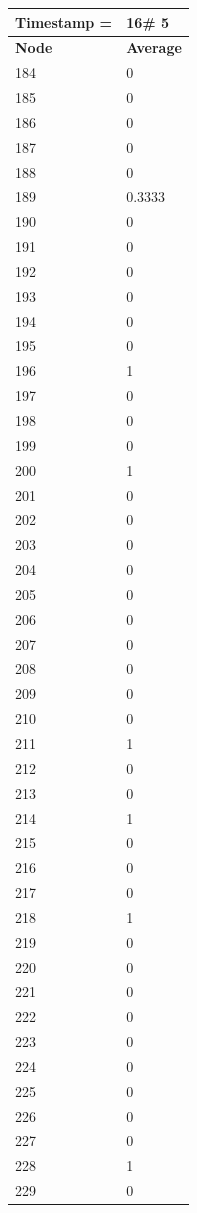 \begin{tabular}{|l||l|}
\hline
\textbf{Timestamp =} & \textbf{16}\# 5\\\hline
	\textbf{Node} & \textbf{Average} \\ \hline
\hline
	184 & 0 \\ \hline
	185 & 0 \\ \hline
	186 & 0 \\ \hline
	187 & 0 \\ \hline
	188 & 0 \\ \hline
	189 & 0.3333 \\ \hline
	190 & 0 \\ \hline
	191 & 0 \\ \hline
	192 & 0 \\ \hline
	193 & 0 \\ \hline
	194 & 0 \\ \hline
	195 & 0 \\ \hline
	196 & 1 \\ \hline
	197 & 0 \\ \hline
	198 & 0 \\ \hline
	199 & 0 \\ \hline
	200 & 1 \\ \hline
	201 & 0 \\ \hline
	202 & 0 \\ \hline
	203 & 0 \\ \hline
	204 & 0 \\ \hline
	205 & 0 \\ \hline
	206 & 0 \\ \hline
	207 & 0 \\ \hline
	208 & 0 \\ \hline
	209 & 0 \\ \hline
	210 & 0 \\ \hline
	211 & 1 \\ \hline
	212 & 0 \\ \hline
	213 & 0 \\ \hline
	214 & 1 \\ \hline
	215 & 0 \\ \hline
	216 & 0 \\ \hline
	217 & 0 \\ \hline
	218 & 1 \\ \hline
	219 & 0 \\ \hline
	220 & 0 \\ \hline
	221 & 0 \\ \hline
	222 & 0 \\ \hline
	223 & 0 \\ \hline
	224 & 0 \\ \hline
	225 & 0 \\ \hline
	226 & 0 \\ \hline
	227 & 0 \\ \hline
	228 & 1 \\ \hline
	229 & 0 \\ \hline
\end{tabular}
